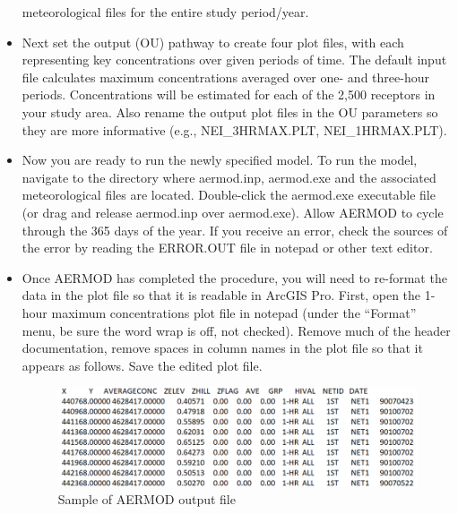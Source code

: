 \documentclass[
  letterpaper,
  DIV=11,
  numbers=noendperiod]{scrartcl}
\begin{document}
\begin{itemize}
  meteorological files for the entire study period/year.
\item
  Next set the output (OU) pathway to create four plot files, with each
  representing key concentrations over given periods of time. The
  default input file calculates maximum concentrations averaged over
  one- and three-hour periods. Concentrations will be estimated for each
  of the 2,500 receptors in your study area. Also rename the output plot
  files in the OU parameters so they are more informative (e.g.,
  NEI\_3HRMAX.PLT, NEI\_1HRMAX.PLT).
\item
  Now you are ready to run the newly specified model. To run the model,
  navigate to the directory where aermod.inp, aermod.exe and the
  associated meteorological files are located. Double-click the
  aermod.exe executable file (or drag and release aermod.inp over
  aermod.exe). Allow AERMOD to cycle through the 365 days of the year.
  If you receive an error, check the sources of the error by reading the
  ERROR.OUT file in notepad or other text editor.
\item
  Once AERMOD has completed the procedure, you will need to re-format
  the data in the plot file so that it is readable in ArcGIS Pro. First,
  open the 1-hour maximum concentrations plot file in notepad (under the
  ``Format'' menu, be sure the word wrap is off, not checked). Remove
  much of the header documentation, remove spaces in column names in the
  plot file so that it appears as follows. Save the edited plot file.

  \begin{figure}

  {\centering \includegraphics{images/paste-B5992985.png}

  }

  \caption{Sample of AERMOD output file}


\end{figure}
\end{itemize}
\end{document}
